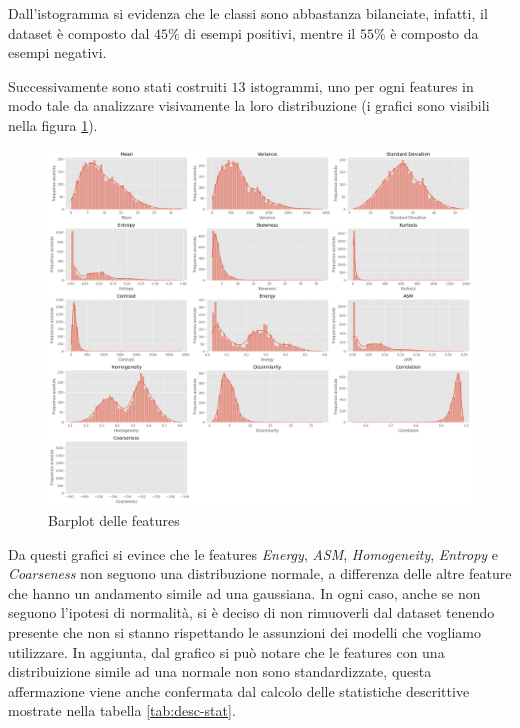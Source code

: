 Dall'istogramma si evidenza che le classi sono abbastanza bilanciate, infatti, 
il dataset è composto dal $45\%$ di esempi positivi, mentre il $55\%$ è composto
da esempi negativi. 

Successivamente sono stati costruiti $13$ istogrammi, uno per ogni features
in modo tale da analizzare visivamente la loro distribuzione (i grafici sono visibili 
nella figura \ref{fig:barplot_features}).

\begin{figure}[!h]
      \centering
      \includegraphics[width=\textwidth]{img/analisi/barplot.png}
      \caption{Barplot delle features}
      \label{fig:barplot_features}
\end{figure}

Da questi grafici si evince che le features \textit{Energy}, \textit{ASM}, \textit{Homogeneity},
\textit{Entropy} e \textit{Coarseness} non seguono una distribuzione normale, a differenza delle
altre feature che hanno un andamento simile ad una gaussiana. In ogni caso, anche se non
seguono l'ipotesi di normalità, si è deciso di non rimuoverli dal dataset tenendo 
presente che non si stanno rispettando le assunzioni dei modelli che vogliamo utilizzare. 
In aggiunta, dal grafico si può notare che le features con una distribuizione 
simile ad una normale non sono standardizzate, questa affermazione viene anche 
confermata dal calcolo delle statistiche descrittive mostrate nella tabella \ref{tab:desc-stat}.

\newpage

